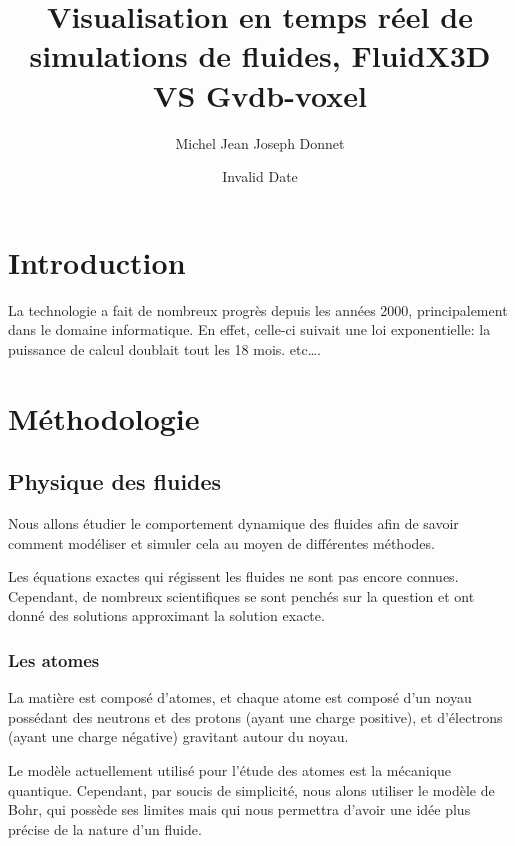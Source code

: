 \documentclass[
]{report}
\title{Visualisation en temps réel de simulations de fluides, FluidX3D
VS Gvdb-voxel}
\author{Michel Jean Joseph Donnet}
\date{Invalid Date}
\renewcommand*\contentsname{Table des matières}
\newcommand\contentsname{Table des matières}
\begin{document}
\maketitle

\renewcommand*\contentsname{Table des matières}
{
\hypersetup{linkcolor=}
\setcounter{tocdepth}{2}
\tableofcontents
}
\newpage

\chapter{Introduction}\label{introduction}

La technologie a fait de nombreux progrès depuis les années 2000,
principalement dans le domaine informatique. En effet, celle-ci suivait
une loi exponentielle: la puissance de calcul doublait tout les 18 mois.
etc\ldots.

\newpage

\chapter{Méthodologie}\label{muxe9thodologie}

\section{Physique des fluides}\label{physique-des-fluides}

Nous allons étudier le comportement dynamique des fluides afin de savoir
comment modéliser et simuler cela au moyen de différentes méthodes.

Les équations exactes qui régissent les fluides ne sont pas encore
connues. Cependant, de nombreux scientifiques se sont penchés sur la
question et ont donné des solutions approximant la solution exacte.

\subsection{Les atomes}\label{les-atomes}

La matière est composé d'atomes, et chaque atome est composé d'un noyau
possédant des neutrons et des protons (ayant une charge positive), et
d'électrons (ayant une charge négative) gravitant autour du noyau.

Le modèle actuellement utilisé pour l'étude des atomes est la mécanique
quantique. Cependant, par soucis de simplicité, nous alons utiliser le
modèle de Bohr, qui possède ses limites mais qui nous permettra d'avoir
une idée plus précise de la nature d'un fluide.
\end{document}
